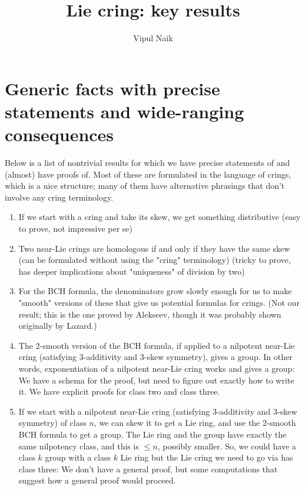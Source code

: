 \documentclass[10pt]{amsart}
\title{Lie cring: key results}
\author{Vipul Naik}
\begin{document}
\maketitle

\section*{Generic facts with precise statements and wide-ranging consequences}

Below is a list of nontrivial results for which we have precise
statements of and (almost) have proofs of. Most of these are
formulated in the language of crings, which is a nice structure; many
of them have alternative phrasings that don't involve any cring
terminology.

\begin{enumerate}

\item If we start with a cring and take its skew, we get something
  distributive (easy to prove, not impressive per se)

\item Two near-Lie crings are homologous if and only if they have the same
  skew (can be formulated without using the "cring" terminology) (tricky
  to prove, has deeper implications about "uniqueness" of division by
  two)

\item For the BCH formula, the denominators grow slowly enough for us
  to make "smooth" versions of these that give us potential formulas
  for crings. (Not our result; this is the one proved by Alekseev,
  though it was probably shown originally by Lazard.)

\item The 2-smooth version of the BCH formula, if applied to a
  nilpotent near-Lie cring (satisfying 3-additivity and 3-skew
  symmetry), gives a group. In other words, exponentiation of a
  nilpotent near-Lie cring works and gives a group: We have a schema for
  the proof, but need to figure out exactly how to write it. We have
  explicit proofs for class two and class three.

\item If we start with a nilpotent near-Lie cring (satisfying
  3-additivity and 3-skew symmetry) of class $n$, we can skew it to
  get a Lie ring, and use the 2-smooth BCH formula to get a group. The
  Lie ring and the group have exactly the same nilpotency class, and
  this is $\le n$, possibly smaller. So, we could have a class $k$
  group with a class $k$ Lie ring but the Lie cring we need to go via
  has class three: We don't have a general proof, but some
  computations that suggest how a general proof would proceed.

\end{enumerate}
\end{document}
